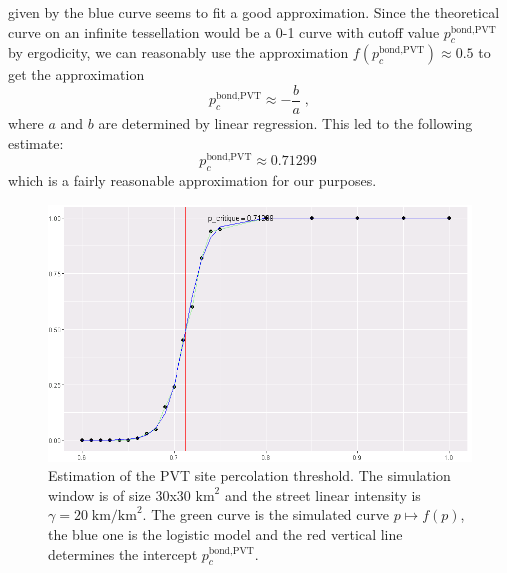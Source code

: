 \documentclass[conference]{IEEEtran}
\begin{document}
given by the blue curve seems to fit a good approximation. Since the theoretical curve on an infinite tessellation would be a 0-1 curve with cutoff value $p_{c}^{\text{bond,PVT}}$ by ergodicity, we can reasonably use the approximation $f\left(p_{c}^{\text{bond,PVT}}\right) \approx 0.5$ to get the approximation
\begin{equation*}
p_{c}^{\text{bond,PVT}} \approx -\frac{b}{a} \; ,
\end{equation*}
where $a$ and $b$ are determined by linear regression. This led to the following estimate:
\begin{equation*}
p_{c}^{\text{bond,PVT}} \approx 0.71299 \;  %
\end{equation*}
which is a fairly reasonable approximation for our purposes.
\begin{figure}[t!]
\includegraphics[width=\columnwidth]{Figures/PVT-site-threshold.png}
\caption{Estimation of the PVT site percolation threshold. The simulation window is of size 30x30 $\text{km}^{2}$ and the street linear intensity is $\gamma = 20 \; \text{km/km}^{2}$. The green curve is the simulated curve $p \mapsto f(p)$, the blue one is the logistic model and the red vertical line determines the intercept $p_{c}^{\text{bond,PVT}}$.}
\label{site-threshold}
\end{figure}\\
\end{document}
